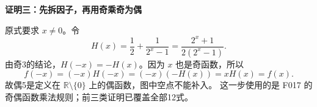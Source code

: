 \clearpage
\begin{proofbox}
\textbf{\textcolor{CProof}{证明三：先拆因子，再用奇乘奇为偶}}


原式要求 $x\ne0$。令
\[
H(x)=\frac12+\frac1{2^x-1}=\frac{2^x+1}{2(2^x-1)}.
\]
由奇3的结论，$H(-x)=-H(x)$。因为 $x$ 也是奇函数，所以
\[
f(-x)=(-x)H(-x)=(-x)(-H(x))=xH(x)=f(x).
\]
故偶5是定义在 $\mathbb R\setminus\{0\}$ 上的偶函数，图中空点不能补入。
这一步使用的是 F017 的奇偶函数乘法规则；前三类证明已覆盖全部12式。
\end{proofbox}
